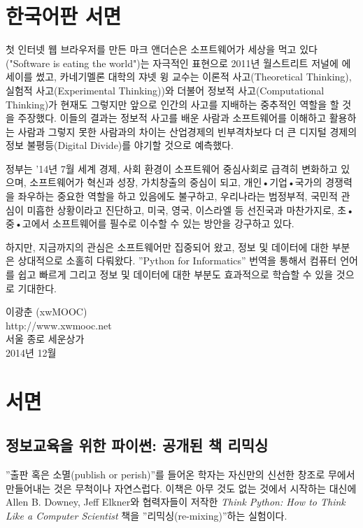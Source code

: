 
\chapter{한국어판 서면}

첫 인터넷 웹 브라우저를 만든 마크 앤더슨은 소프트웨어가 세상을 먹고 있다("Software is eating the world")는 자극적인 표현으로 2011년 월스트리트 저널에 에세이를 썼고, 카네기멜론 대학의 쟈넷 윙 교수는 이론적 사고(Theoretical Thinking), 실험적 사고(Experimental Thinking))와 더불어 정보적 사고(Computational Thinking)가 현재도 그렇지만 앞으로 인간의 사고를 지배하는 중추적인 역할을 할 것을 주장했다. 이들의 결과는 정보적 사고를 배운 사람과 소프트웨어를 이해하고 활용하는 사람과 그렇지 못한 사람과의 차이는 산업경제의 빈부격차보다 더 큰 디지털 경제의 정보 불평등(Digital Divide)를 야기할 것으로 예측했다.

정부는  ’14년 7월 세계 경제, 사회 환경이 소프트웨어 중심사회로 급격히 변화하고 있으며, 소프트웨어가 혁신과 성장, 가치창출의 중심이 되고, 개인•기업•국가의 경쟁력을 좌우하는 중요한 역할을 하고 있음에도 불구하고, 우리나라는 범정부적, 국민적 관심이 미흡한 상황이라고 진단하고, 미국, 영국, 이스라엘 등 선진국과 마찬가지로, 초•중•고에서 소프트웨어를 필수로 이수할 수 있는 방안을 강구하고 있다.

하지만, 지금까지의 관심은 소프트웨어만 집중되어 왔고, 정보 및 데이터에 대한 부분은 상대적으로 소홀히 다뤄왔다. 
''Python for Informatics'' 번역을 통해서 컴퓨터 언어를 쉽고 빠르게 그리고 정보 및 데이터에 대한 부분도 효과적으로 학습할 수 있을 것으로 기대한다.

이광춘 (xwMOOC)\\
http://www.xwmooc.net\\
서울 종로 세운상가\\
2014년 12월

\chapter{서면}

\section*{정보교육을 위한 파이썬: 공개된 책 리믹싱}
''출판 혹은 소멸(publish or perish)''를 들어온 학자는 자신만의 신선한 창조로 무에서 만들어내는 것은 무척이나 자연스럽다.
이책은 아무 것도 없는 것에서 시작하는 대신에 Allen B. Downey, Jeff Elkner와 협력자들이 저작한 \emph{Think Python: How to Think Like
a Computer Scientist} 책을 ''리믹싱(re-mixing)''하는 실험이다.

